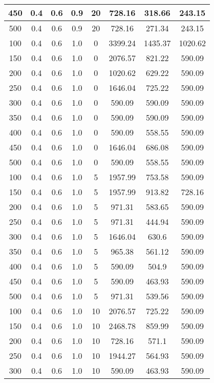 \documentclass[a4paper, 12pt]{extreport}
\begin{document}
\begin{itemize}
\begin{longtable}{|c|c|c|c|c|c|c|c|}
			450 & 0.4 & 0.6 & 0.9 & 20 & 728.16 & 318.66 & 243.15 \\\hline
			500 & 0.4 & 0.6 & 0.9 & 20 & 728.16 & 271.34 & 243.15 \\\hline
			100 & 0.4 & 0.6 & 1.0 & 0 & 3399.24 & 1435.37 & 1020.62 \\\hline
			150 & 0.4 & 0.6 & 1.0 & 0 & 2076.57 & 821.22 & 590.09 \\\hline
			200 & 0.4 & 0.6 & 1.0 & 0 & 1020.62 & 629.22 & 590.09 \\\hline
			250 & 0.4 & 0.6 & 1.0 & 0 & 1646.04 & 725.22 & 590.09 \\\hline
			300 & 0.4 & 0.6 & 1.0 & 0 & 590.09 & 590.09 & 590.09 \\\hline
			350 & 0.4 & 0.6 & 1.0 & 0 & 590.09 & 590.09 & 590.09 \\\hline
			400 & 0.4 & 0.6 & 1.0 & 0 & 590.09 & 558.55 & 590.09 \\\hline
			450 & 0.4 & 0.6 & 1.0 & 0 & 1646.04 & 686.08 & 590.09 \\\hline
			500 & 0.4 & 0.6 & 1.0 & 0 & 590.09 & 558.55 & 590.09 \\\hline
			100 & 0.4 & 0.6 & 1.0 & 5 & 1957.99 & 753.58 & 590.09 \\\hline
			150 & 0.4 & 0.6 & 1.0 & 5 & 1957.99 & 913.82 & 728.16 \\\hline
			200 & 0.4 & 0.6 & 1.0 & 5 & 971.31 & 583.65 & 590.09 \\\hline
			250 & 0.4 & 0.6 & 1.0 & 5 & 971.31 & 444.94 & 590.09 \\\hline
			300 & 0.4 & 0.6 & 1.0 & 5 & 1646.04 & 630.6 & 590.09 \\\hline
			350 & 0.4 & 0.6 & 1.0 & 5 & 965.38 & 561.12 & 590.09 \\\hline
			400 & 0.4 & 0.6 & 1.0 & 5 & 590.09 & 504.9 & 590.09 \\\hline
			450 & 0.4 & 0.6 & 1.0 & 5 & 590.09 & 463.93 & 590.09 \\\hline
			500 & 0.4 & 0.6 & 1.0 & 5 & 971.31 & 539.56 & 590.09 \\\hline
			100 & 0.4 & 0.6 & 1.0 & 10 & 2076.57 & 725.22 & 590.09 \\\hline
			150 & 0.4 & 0.6 & 1.0 & 10 & 2468.78 & 859.99 & 590.09 \\\hline
			200 & 0.4 & 0.6 & 1.0 & 10 & 728.16 & 571.1 & 590.09 \\\hline
			250 & 0.4 & 0.6 & 1.0 & 10 & 1944.27 & 564.93 & 590.09 \\\hline
			300 & 0.4 & 0.6 & 1.0 & 10 & 590.09 & 463.93 & 590.09 \\\hline

\end{longtable}
\end{itemize}
\end{document}
